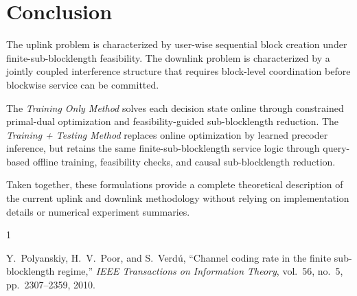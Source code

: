\documentclass[11pt]{article}
\begin{document}
\section{Conclusion}

The uplink problem is characterized by user-wise sequential block creation under
finite-sub-blocklength feasibility. The downlink problem is characterized by a
jointly coupled interference structure that requires block-level coordination
before blockwise service can be committed.

The \emph{Training Only Method} solves each decision state online through
constrained primal-dual optimization and feasibility-guided sub-blocklength
reduction. The \emph{Training + Testing Method} replaces online optimization by
learned precoder inference, but retains the same finite-sub-blocklength service
logic through query-based offline training, feasibility checks, and causal
sub-blocklength reduction.

Taken together, these formulations provide a complete theoretical description of
the current uplink and downlink methodology without relying on implementation
details or numerical experiment summaries.

\begin{thebibliography}{1}

Y.~Polyanskiy, H.~V.~Poor, and S.~Verd\'u,
``Channel coding rate in the finite sub-blocklength regime,''
\emph{IEEE Transactions on Information Theory},
vol.~56, no.~5, pp.~2307--2359, 2010.

\end{thebibliography}
\end{document}
